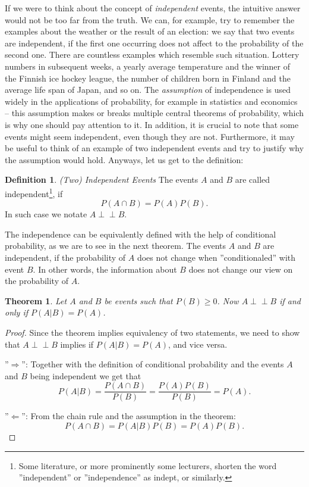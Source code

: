 \documentclass[12pt,a4paper,leqno]{report}
\def\independent{\perp\!\!\!\perp}
\theoremstyle{plain}
\newtheorem{lause}[equation]{Theorem}
\theoremstyle{definition}
\newtheorem{maar}[equation]{Definition}
\begin{document}
If we were to think about the concept of \emph{independent} events, the intuitive answer would not be too far from the truth. We can, for example, try to remember the examples about the weather or the result of an election: we say that two events are independent, if the first one occurring does not affect to the probability of the second one. There are countless examples which resemble such situation. Lottery numbers in subsequent weeks, a yearly average temperature and the winner of the Finnish ice hockey league, the number of children born in Finland and the average life span of Japan, and so on. The \emph{assumption} of independence is used widely in the applications of probability, for example in statistics and economics -- this assumption makes or breaks multiple central theorems of probability, which is why one should pay attention to it. In addition, it is crucial to note that some events might seem independent, even though they are not. Furthermore, it may be useful to think of an example of two independent events and try to justify why the assumption would hold. Anyways, let us get to the definition:

\begin{maar}\label{maar:indept} \emph{(Two) Independent Events} The events $A$ and $B$ 
are called independent\footnote{Some literature, or more prominently some lecturers, shorten the word ''independent'' or ''independence'' as indept, or similarly.}, if
\[
P(A \cap B) = P(A)P(B).
\]
In such case we notate $A \independent B$.
\end{maar}

The independence can be equivalently defined with the help of conditional probability, as we are to see in the next theorem. The events $A$ and $B$ are independent, if the probability of $A$ does not change when ''conditionaled'' with event $B$. In other words, the information about $B$ does not change our view on the probability of $A$.

\begin{lause}
\label{lause:conditional_prob}
Let $A$ and $B$ be events such that $P(B) \geq 0$. Now $A \independent B$ if and only if $P(A|B) = P(A)$.
\end{lause}

\begin{proof}
Since the theorem implies equivalency of two statements, we need to show that $A \independent B$ implies if $P(A|B) = P(A)$, and vice versa.

''$\Rightarrow$'': Together with the definition of conditional probability and the events $A$ and $B$ being independent we get that
\[
P(A|B) = \frac{P(A \cap B)}{P(B)} = \frac{P(A)P(B)}{P(B)} = P(A).
\]

''$\Leftarrow$'': From the chain rule and the assumption in the theorem:
\[
P(A \cap B) = P(A|B)P(B) = P(A)P(B).
\]
\end{proof}
\end{document}
